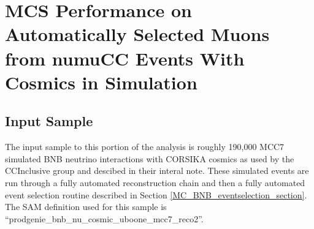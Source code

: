 \section{MCS Performance on Automatically Selected Muons from numuCC Events With Cosmics in Simulation}\label{MC_performance_section}

\subsection{Input Sample}\label{MC_BNB_input_sample_section}
The input sample to this portion of the analysis is roughly 190,000 MCC7 simulated BNB neutrino interactions with CORSIKA cosmics as used by the CCInclusive group and descibed in their interal note\cite{CCIncInternalNote}. These simulated events are run through a fully automated reconstruction chain and then a fully automated event selection routine described in Section \ref{MC_BNB_eventselection_section}. The SAM definition used for this sample is ``prodgenie\_bnb\_nu\_cosmic\_uboone\_mcc7\_reco2''.

